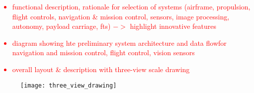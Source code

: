 \textcolor{red}{
\begin{itemize}
	\item
	      functional description, rationale for selection of systems (airframe, propulsion, flight controls, navigation \& mission control, sensors, image processing, autonomy, payload carriage, fts) $->$ highlight innovative features
	\item
	      diagram showing hte preliminary system architecture and data flowfor navigation and mission control, flight control, vision sensors
	\item
		overall layout \& description with three-view scale drawing
\end{itemize}
}

\begin{figure}[H]
	\centering
	\texttt{[image: three\_view\_drawing]}
\end{figure}

